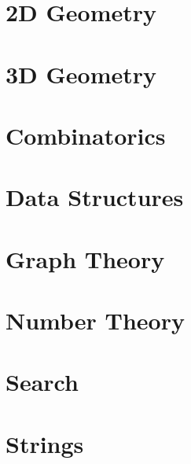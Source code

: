 \documentclass[twocolumn]{article}
\begin{document}
	\section{2D Geometry}
		
	\section{3D Geometry}
	\section{Combinatorics}
		
	\section{Data Structures}
	\section{Graph Theory}
	\section{Number Theory}
		
		
	\section{Search}
		
	\section{Strings}
\end{document}

